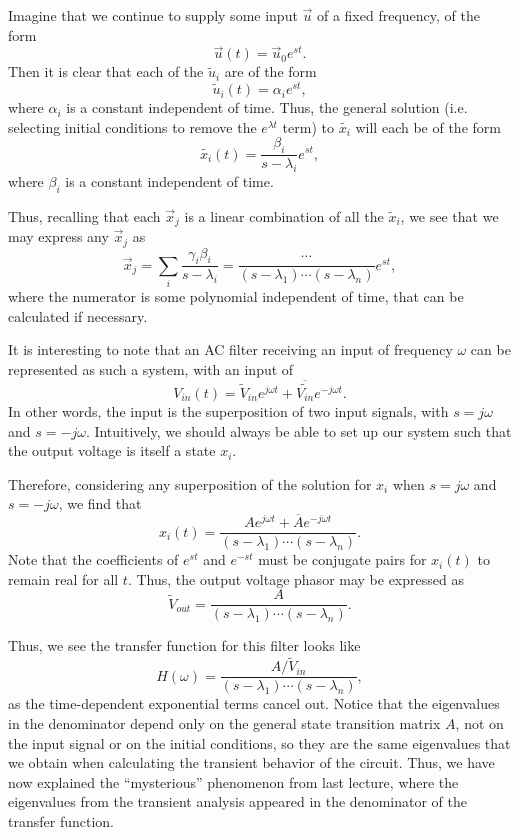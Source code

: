 \documentclass[letterpaper]{article}
\theoremstyle{remark}
\renewcommand{\tilde}[1]{\widetilde{#1}}
\begin{document}
Imagine that we continue to supply some input $\vec{u}$ of a fixed frequency, of the form
\[
    \vec{u}(t) = \vec{u}_0 e^{st}.
\]
Then it is clear that each of the $\tilde{u}_i$ are of the form
\[
    \tilde{u}_i(t) = \alpha_i e^{st},
\]
where $\alpha_i$ is a constant independent of time. Thus, the general solution (i.e. selecting initial conditions to remove the $e^{\lambda t}$ term) to $\tilde{x_i}$ will each be of the form
\[
    \tilde{x_i}(t) = \frac{\beta_i}{s - \lambda_i}e^{st},
\]
where $\beta_i$ is a constant independent of time.

Thus, recalling that each $\vec{x}_j$ is a linear combination of all the $\tilde{x}_i$, we see that we may express any $\vec{x}_j$ as
\[
    \vec{x}_j = \sum_i \frac{\gamma_i\beta_i}{s - \lambda_i} = \frac{\cdots}{(s - \lambda_1)\cdots(s-\lambda_n)} e^{st},
\]
where the numerator is some polynomial independent of time, that can be calculated if necessary.

It is interesting to note that an AC filter receiving an input of frequency $\omega$ can be represented as such a system, with an input of
\[
    V_{in}(t) = \tilde{V}_{in} e^{j\omega t} + \overline{\tilde{V_{in}}}e^{-j\omega t}.
\]
In other words, the input is the superposition of two input signals, with $s = j\omega$ and $s = -j\omega$. Intuitively, we should always be able to set up our system such that the output voltage is itself a state $x_i$.

Therefore, considering any superposition of the solution for $x_i$ when $s = j\omega$ and $s = -j\omega$, we find that
\[
    x_i(t) = \frac{Ae^{j\omega t} + \overline{A} e^{-j\omega t}}{(s - \lambda_1)\cdots(s-\lambda_n)}.
\]
Note that the coefficients of $e^{st}$ and $e^{-st}$ must be conjugate pairs for $x_i(t)$ to remain real for all $t$. Thus, the output voltage phasor may be expressed as
\[
    \tilde{V}_{out} = \frac{A}{(s - \lambda_1)\cdots(s-\lambda_n)}.
\]

Thus, we see the transfer function for this filter looks like
\[
    H(\omega) = \frac{A / \tilde{V}_{in}}{(s - \lambda_1)\cdots(s - \lambda_n)},
\]
as the time-dependent exponential terms cancel out. Notice that the eigenvalues in the denominator depend only on the general state transition matrix $A$, not on the input signal or on the initial conditions, so they are the same eigenvalues that we obtain when calculating the transient behavior of the circuit. 
Thus, we have now explained the ``mysterious'' phenomenon from last lecture, where the eigenvalues from the transient analysis appeared in the denominator of the transfer function.
\end{document}
